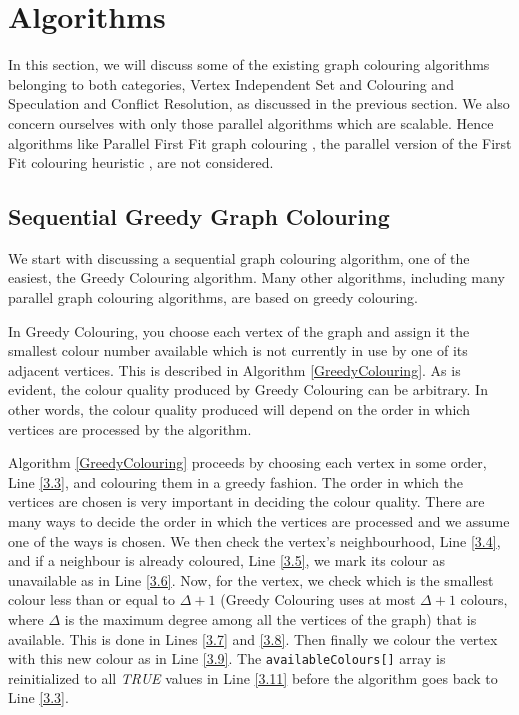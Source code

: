 \documentclass[MTech]{iitmdiss}
\begin{document}
\section{Algorithms}
In this section, we will discuss some of the existing graph colouring algorithms belonging to both categories, Vertex Independent Set and Colouring and Speculation and Conflict Resolution, as discussed in the previous section. We also concern ourselves with only those parallel algorithms which are scalable. Hence algorithms like Parallel First Fit graph colouring \citep{zamanparallel}, the parallel version of the First Fit colouring heuristic \citep{JGT:JGT3190120212}, are not considered. 
\subsection{Sequential Greedy Graph Colouring}
We start with discussing a sequential graph colouring algorithm, one of the easiest, the Greedy Colouring algorithm. Many other algorithms, including many parallel graph colouring algorithms, are based on greedy colouring.

In Greedy Colouring, you choose each vertex of the graph and assign it the smallest colour number available which is not currently in use by one of its adjacent vertices. This is described in Algorithm \ref{GreedyColouring}. As is evident, the colour quality produced by Greedy Colouring can be arbitrary. In other words, the colour quality produced will depend on the order in which vertices are processed by the algorithm.

Algorithm \ref{GreedyColouring} proceeds by choosing each vertex in some order, Line \ref{3.3}, and colouring them in a greedy fashion. The order in which the vertices are chosen is very important in deciding the colour quality. There are many ways to decide the order in which the vertices are processed and we assume one of the ways is chosen. We then check the vertex's neighbourhood, Line \ref{3.4}, and if a neighbour is already coloured, Line \ref{3.5}, we mark its colour as unavailable as in Line \ref{3.6}. Now, for the vertex, we check which is the smallest colour less than or equal to $\Delta+1$ (Greedy Colouring uses at most $\Delta+1$ colours, where $\Delta$ is the maximum degree among all the vertices of the graph) that is available. This is done in Lines \ref{3.7} and \ref{3.8}. Then finally we colour the vertex with this new colour as in Line \ref{3.9}. The \verb+availableColours[]+ array is reinitialized to all \textit{TRUE} values in Line \ref{3.11} before the algorithm goes back to Line \ref{3.3}.  
\end{document}
